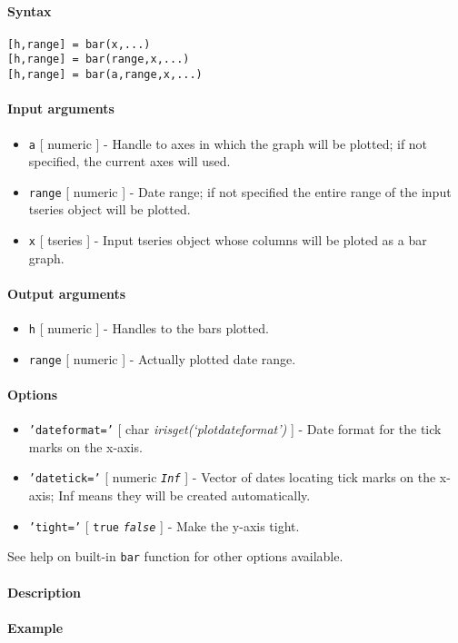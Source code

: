 


	\paragraph{Syntax}\label{syntax}

\begin{verbatim}
[h,range] = bar(x,...)
[h,range] = bar(range,x,...)
[h,range] = bar(a,range,x,...)
\end{verbatim}

\paragraph{Input arguments}\label{input-arguments}

\begin{itemize}
\item
  \texttt{a} {[} numeric {]} - Handle to axes in which the graph will be
  plotted; if not specified, the current axes will used.
\item
  \texttt{range} {[} numeric {]} - Date range; if not specified the
  entire range of the input tseries object will be plotted.
\item
  \texttt{x} {[} tseries {]} - Input tseries object whose columns will
  be ploted as a bar graph.
\end{itemize}

\paragraph{Output arguments}\label{output-arguments}

\begin{itemize}
\item
  \texttt{h} {[} numeric {]} - Handles to the bars plotted.
\item
  \texttt{range} {[} numeric {]} - Actually plotted date range.
\end{itemize}

\paragraph{Options}\label{options}

\begin{itemize}
\item
  \texttt{'dateformat='} {[} char \textbar{}
  \emph{irisget(`plotdateformat')} {]} - Date format for the tick marks
  on the x-axis.
\item
  \texttt{'datetick='} {[} numeric \textbar{} \emph{\texttt{Inf}} {]} -
  Vector of dates locating tick marks on the x-axis; Inf means they will
  be created automatically.
\item
  \texttt{'tight='} {[} \texttt{true} \textbar{} \emph{\texttt{false}}
  {]} - Make the y-axis tight.
\end{itemize}

See help on built-in \texttt{bar} function for other options available.

\paragraph{Description}\label{description}

\paragraph{Example}\label{example}



